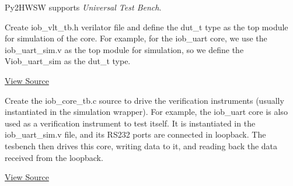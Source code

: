 %

Py2HWSW supports \textit{Universal Test Bench}.

Create iob\_vlt\_tb.h verilator file and define the dut\_t type as the top module for simulation of the core.
For example, for the iob\_uart core, we use the iob\_uart\_sim.v as the top module for simulation, so we define the Viob\_uart\_sim as the dut\_t type.

\href{https://github.com/IObundle/py2hwsw/blob/main/py2hwsw/py2hwsw/lib/peripherals/iob_uart/hardware/simulation/src/iob_vlt_tb.h}{View Source}

Create the iob\_core\_tb.c source to drive the verification instruments (usually instantiated in the simulation wrapper).
For example, the iob\_uart core is also used as a verification instrument to test itself. It is instantiated in the iob\_uart\_sim.v file, and its RS232 ports are connected in loopback. The tesbench then drives this core, writing data to it, and reading back the data received from the loopback.

\href{https://github.com/IObundle/py2hwsw/blob/main/py2hwsw/py2hwsw/lib/peripherals/iob_uart/hardware/simulation/src/iob_core_tb.c}{View Source}
